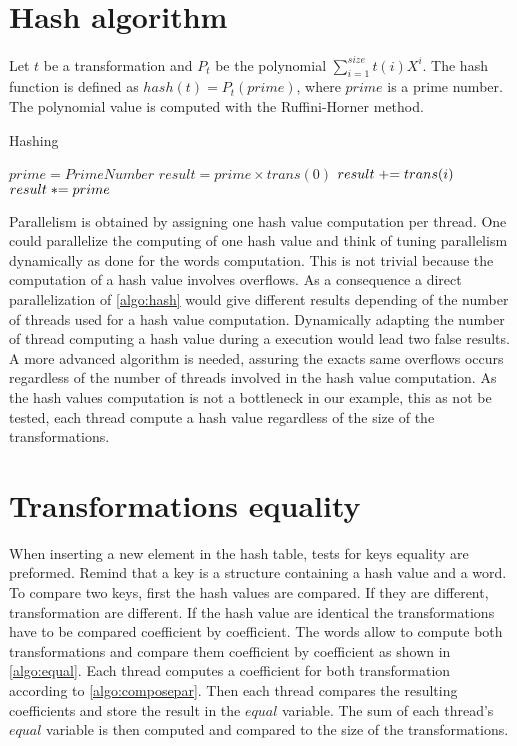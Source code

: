 {\section{Hash algorithm}
Let $t$ be a transformation and $P_{t}$ be the polynomial $\displaystyle\sum_{i=1}^{size} t(i)X^i$. The hash function is defined as $hash(t) = P_{t}(prime)$, where $prime$ is a prime number.
The polynomial value is computed with the Ruffini-Horner method.
\begin{algorithm}
\caption{Hashing}
\label{algo:hash}
\begin{algorithmic}
\STATE $prime = PrimeNumber$
\STATE $result = prime \times trans(0)$
\STATE $\switch result += trans(i)$
\STATE $\switch result *= prime$
\ENDFOR
\end{algorithmic}
\end{algorithm}
Parallelism is obtained by assigning one hash value computation per thread.
One could parallelize the computing of one hash value and think of tuning parallelism dynamically as done for the words computation. This is not trivial because the computation of a hash value involves overflows. As a consequence a direct parallelization of \autoref{algo:hash} would give different results depending of the number of threads used for a hash value computation. Dynamically adapting the number of thread computing a hash value during a execution would lead two false results. A more advanced algorithm is needed, assuring the exacts same overflows occurs regardless of the number of threads involved in the hash value computation. As the hash values computation is not a bottleneck in our example, this as not be tested, each thread compute a hash value regardless of the size of the transformations.


\section{Transformations equality}
\label{part:equality}
When inserting a new element in the hash table, tests for keys equality are preformed.
Remind that a key is a structure containing a hash value and a word.
To compare two keys, first the hash values are compared. If they are different, transformation are different.
If the hash value are identical the transformations have to be compared coefficient by coefficient. The words allow to compute both transformations and compare them coefficient by coefficient as shown in \autoref{algo:equal}.
Each thread computes a coefficient for both transformation according to \autoref{algo:composepar}. Then each thread compares the resulting coefficients and store the result in the $equal$ variable. The sum of each thread's $equal$ variable is then computed and compared to the size of the transformations.
 
}
